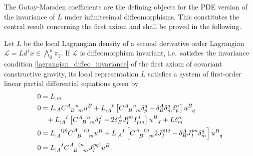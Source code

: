 The Gotay-Marsden coefficients are the defining objects for the PDE version of the invariance of $L$ under infinitesimal diffeomorphisms. This constitutes the central result concerning the first axiom and shall be proved in the following.

\begin{theorem}\label{equivariance_eqns_thm}
  Let $L$ be the local Lagrangian density of a second derivative order Lagrangian $\mathcal L = Ld^4x \in \textstyle\bigwedge_0^n\pi_2$. If $\mathcal L$ is diffeomorphism invariant, i.e.~satisfies the invariance condition \eqref{lagrangian_diffeo_invariance} of the first axiom of covariant constructive gravity, its local representation $L$ satisfies a system of first-order linear partial differential equations given by
  \begin{subequations}\label{equivariance_eqns}
    \begin{align}
      0 &{} = L_{,m} \label{equivariance_eqn_1}\\
      0 &{} = L_{:A} \gmc{A}{B}{n}{m}u^B + L_{:A}^{\hphantom{:A}p}\left\lbrack\gmc{A}{B}{n}{m} \delta^q_p - \delta^A_B\delta^q_m\delta^n_p\right\rbrack u^{B}_{\hphantom Bq} \nonumber \\
        &{} \hphantom{=} + L_{:A}^{\hphantom{:A}I} \left\lbrack\gmc{A}{B}{n}{m} \delta^J_I - 2 \delta^A_B J^{pn}_{I} I^J_{pm}\right\rbrack u^B_{\hphantom BJ} + L\delta^n_m \label{equivariance_eqn_2}\\
      0 &{} = L_{:A}^{\hphantom{:A}(p\mid} \gmc{A}{B}{\mid n)}{m} u^B + L_{:A}^{\hphantom{:A}I}\left\lbrack\gmc{A}{B}{(n}{m} 2J^{p)q}_I - \delta^A_B J^{pn}_I \delta^q_m\right\rbrack u^B_{\hphantom Bq} \label{equivariance_eqn_3}\\
      0 &{} = L_{:A}^{\hphantom{:A}I} \gmc{A}{B}{(n}{m} J^{pq)}_I u^B.\label{equivariance_eqn_4}
    \end{align}
  \end{subequations}
\end{theorem}
